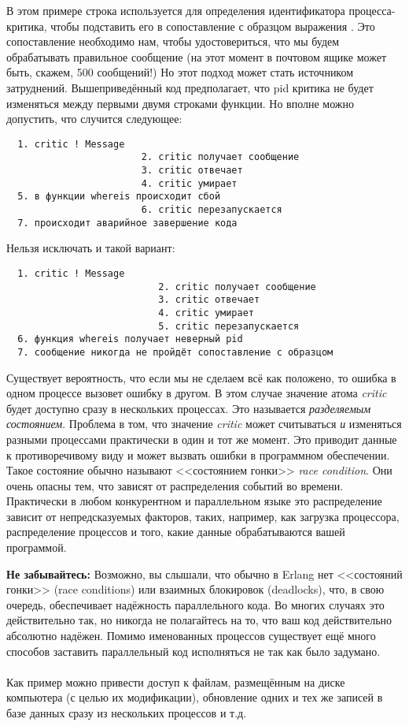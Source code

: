 В этом примере строка  используется для определения идентификатора процесса\--критика, чтобы подставить его в сопоставление с образцом выражения .
Это сопоставление необходимо нам, чтобы удостовериться, что мы будем обрабатывать правильное сообщение (на этот момент в почтовом ящике может быть, скажем, 500 сообщений!)
Но этот подход может стать источником затруднений.
Вышеприведённый код предполагает, что pid критика не будет изменяться между первыми двумя строками функции.
Но вполне можно допустить, что случится следующее:
\begin{verbatim}
  1. critic ! Message
                        2. critic получает сообщение
                        3. critic отвечает
                        4. critic умирает
  5. в функции whereis происходит сбой
                        6. critic перезапускается
  7. происходит аварийное завершение кода
\end{verbatim}

Нельзя исключать и такой вариант:
\begin{verbatim}
  1. critic ! Message
                           2. critic получает сообщение
                           3. critic отвечает
                           4. critic умирает
                           5. critic перезапускается
  6. функция whereis получает неверный pid
  7. сообщение никогда не пройдёт сопоставление с образцом
\end{verbatim}

Существует вероятность, что если мы не сделаем всё как положено, то ошибка в одном процессе вызовет ошибку в другом.
В этом случае значение атома \emph{critic} будет доступно  сразу в нескольких процессах.
Это называется \emph{разделяемым состоянием}.
Проблема в том, что значение \emph{critic} может считываться \emph{и} изменяться разными процессами практически в один и тот же момент.
Это приводит данные к противоречивому виду и может вызвать ошибки в программном обеспечении.
Такое состояние обычно называют <<состоянием гонки>> \emph{race condition}.
Они очень опасны тем, что зависят от распределения событий во времени.
Практически в любом конкурентном и параллельном языке это распределение зависит от непредсказуемых факторов, таких, например, как загрузка процессора, распределение процессов и того, какие данные обрабатываются вашей программой.\\
\colorbox{lorange}
{
\begin{minipage}{1.0\linewidth}
    \textbf{Не забывайтесь:} 
Возможно, вы слышали, что обычно в Erlang нет <<состояний гонки>> (race conditions) или взаимных блокировок (deadlocks), что, в свою очередь, обеспечивает надёжность параллельного кода.
Во многих случаях это действительно так, но никогда не полагайтесь на то, что ваш код действительно абсолютно надёжен.
Помимо именованных процессов существует ещё много способов заставить параллельный код исполняться не так как было задумано.\\
\\
Как пример можно привести доступ к файлам, размещённым на диске компьютера (с целью их модификации), обновление одних и тех же записей в базе данных сразу из нескольких процессов и т.д.
\end{minipage}
}

